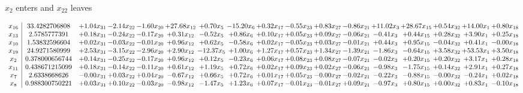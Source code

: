 \documentclass[9pt]{article}
\begin{document}
 $ x_{2} $ enters and $ x_{22} $ leaves 

 \[\begin{array}{c| c c@{\hskip 2pt} c@{\hskip 2pt} c@{\hskip 2pt} c@{\hskip 2pt} c@{\hskip 2pt} c@{\hskip 2pt} c@{\hskip 2pt} c@{\hskip 2pt} c@{\hskip 2pt} c@{\hskip 2pt} c@{\hskip 2pt} c@{\hskip 2pt} c@{\hskip 2pt} c@{\hskip 2pt} c@{\hskip 2pt} }
 x_{16}   &  33.4282706808 & +  1.04 x_{31} & -2.14 x_{22} & -1.60 x_{20} & + 27.68 x_{12} & +  0.70 x_{5} & -15.20 x_{6} & +  0.32 x_{17} & -0.55 x_{23} & +  0.83 x_{27} & -0.86 x_{21} & + 11.02 x_{3} & + 28.67 x_{15} & +  0.54 x_{32} & + 14.00 x_{1} & +  0.80 x_{18}\\
 x_{13}   &  2.5785777391 & +  0.18 x_{31} & -0.24 x_{22} & -0.17 x_{20} & +  0.31 x_{12} & -0.52 x_{5} & +  0.86 x_{6} & +  0.10 x_{17} & +  0.05 x_{23} & +  0.09 x_{27} & -0.06 x_{21} & -0.41 x_{3} & +  0.44 x_{15} & +  0.28 x_{32} & +  3.90 x_{1} & +  0.25 x_{18}\\
 x_{10}   &  1.53832596604 & +  0.02 x_{31} & -0.03 x_{22} & -0.01 x_{20} & +  0.96 x_{12} & +  0.62 x_{5} & -0.58 x_{6} & +  0.02 x_{17} & -0.05 x_{23} & +  0.03 x_{27} & -0.01 x_{21} & +  0.44 x_{3} & +  0.95 x_{15} & -0.04 x_{32} & +  0.41 x_{1} & -0.00 x_{18}\\
 x_{19}   &  24.9271580999 & +  2.53 x_{31} & -3.15 x_{22} & -2.96 x_{20} & +  2.90 x_{12} & -12.37 x_{5} & +  1.00 x_{6} & +  1.27 x_{17} & +  0.57 x_{23} & +  1.34 x_{27} & -1.39 x_{21} & -1.86 x_{3} & -0.64 x_{15} & +  3.58 x_{32} & + 53.53 x_{1} & +  3.50 x_{18}\\
 x_{2}   &  0.378000656744 & +  0.14 x_{31} & -0.25 x_{22} & -0.17 x_{20} & +  0.96 x_{12} & +  0.12 x_{5} & -0.23 x_{6} & +  0.06 x_{17} & +  0.08 x_{23} & +  0.08 x_{27} & -0.07 x_{21} & -0.02 x_{3} & +  0.20 x_{15} & +  0.20 x_{32} & +  3.17 x_{1} & +  0.28 x_{18}\\
 x_{11}   &  0.438671215099 & +  0.18 x_{31} & -0.14 x_{22} & -0.11 x_{20} & +  0.61 x_{12} & +  1.19 x_{5} & +  0.72 x_{6} & +  0.02 x_{17} & +  0.09 x_{23} & +  0.02 x_{27} & -0.06 x_{21} & -0.98 x_{3} & -1.75 x_{15} & +  0.14 x_{32} & +  2.91 x_{1} & +  0.27 x_{18}\\
 x_{7}   &  2.6338668626 & -0.00 x_{31} & +  0.03 x_{22} & +  0.04 x_{20} & -0.67 x_{12} & +  0.66 x_{5} & +  0.72 x_{6} & +  0.01 x_{17} & +  0.05 x_{23} & -0.00 x_{27} & -0.02 x_{21} & -0.22 x_{3} & -0.88 x_{15} & -0.00 x_{32} & -0.24 x_{1} & +  0.02 x_{18}\\
 x_{8}   &  0.988300750221 & +  0.03 x_{31} & +  0.10 x_{22} & -0.03 x_{20} & -0.98 x_{12} & -1.47 x_{5} & +  1.23 x_{6} & +  0.07 x_{17} & -0.01 x_{23} & -0.01 x_{27} & +  0.09 x_{21} & -0.97 x_{3} & +  0.80 x_{15} & +  0.00 x_{32} & +  0.83 x_{1} & -0.10 x_{18}\\

\end{array}\]
\end{document}
